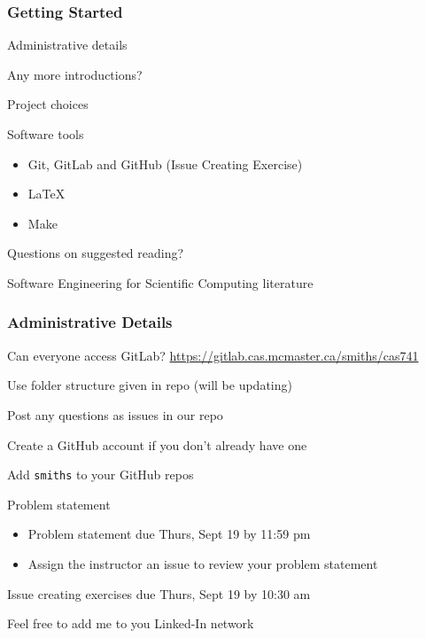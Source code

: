 \documentclass[t,12pt,numbers,fleqn]{beamer}
\begin{document}




\begin{frame}
\frametitle{Getting Started}

\bi
\item Administrative details
\item Any more introductions?
\item Project choices
\item Software tools
\begin{itemize}
\item Git, GitLab and GitHub (Issue Creating Exercise)
\item LaTeX
\item Make
\end{itemize}
\item Questions on suggested reading?
\item Software Engineering for Scientific Computing literature
\ei

\end{frame}


\begin{frame}
\frametitle{Administrative Details}

\bi
\item Can everyone access GitLab?
  \href{https://gitlab.cas.mcmaster.ca/smiths/cas741}
  {https://gitlab.cas.mcmaster.ca/smiths/cas741}
\item Use folder structure given in repo (will be updating)
\item Post any questions as issues in our repo
\item Create a GitHub account if you don't already have one
\item Add \texttt{smiths} to your GitHub repos
\item Problem statement
\begin{itemize}
\item Problem statement due Thurs, Sept 19 by 11:59 pm
\item Assign the instructor an issue to review your problem
    statement
\end{itemize}
\item Issue creating exercises due Thurs, Sept 19 by 10:30 am
\item Feel free to add me to you Linked-In network
\ei

\end{frame}
\end{document}
